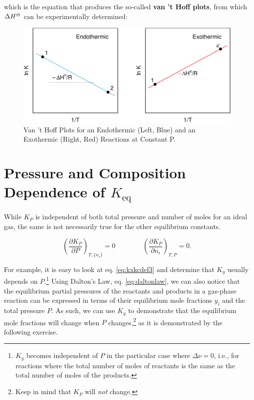 \documentclass[
  9pt,
]{extbook}
\theoremstyle{definition}
\theoremstyle{definition}
\theoremstyle{definition}
\theoremstyle{remark}
\begin{document}
which is the equation that produces the so-called \textbf{van 't Hoff plots}, from which \(\Delta H^{-\kern-6pt{\ominus}\kern-6pt-}\) can be experimentally determined:

\begin{figure}

{\centering \includegraphics{pchem1_files/figure-latex/vthoffplt-1} 

}

\caption{Van 't Hoff Plots for an Endothermic (Left, Blue) and an Exothermic (Right, Red) Reactions at Constant P.}\label{fig:vthoffplt}
\end{figure}

\hypertarget{pressure-and-composition-dependence-of-k_texteq}{%
\section{\texorpdfstring{Pressure and Composition Dependence of \(K_{\text{eq}}\)}{Pressure and Composition Dependence of K\_\{\textbackslash text\{eq\}\}}}\label{pressure-and-composition-dependence-of-k_texteq}}

While \(K_P\) is independent of both total pressure and number of moles for an ideal gas, the same is not necessarily true for the other equilibrium constants.

\begin{equation}
\left( \frac{\partial K_P}{\partial P} \right)_{T,\{n_i\}} = 0 \qquad \qquad \left( \frac{\partial K_P}{\partial n_i} \right)_{T,P} =0.
\label{eq:kppni}
\end{equation}

For example, it is easy to look at eq. \eqref{eq:kxkcdef3} and determine that \(K_y\) usually depends on \(P\).\footnote{\(K_y\) becomes independent of \(P\) in the particular case where \(\Delta \nu=0\), i.e., for reactions where the total number of moles of reactants is the same as the total number of moles of the products.} Using Dalton's Law, eq. \eqref{eq:daltonlaw}, we can also notice that the equilibrium partial pressures of the reactants and products in a gas-phase reaction can be expressed in terms of their equilibrium mole fractions \(y_i\) and the total pressure \(P\). As such, we can use \(K_y\) to demonstrate that the equilibrium mole fractions will change when \(P\) changes,\footnote{Keep in mind that \(K_P\) will \emph{not} change.} as it is demonstrated by the following exercise.
\end{document}
